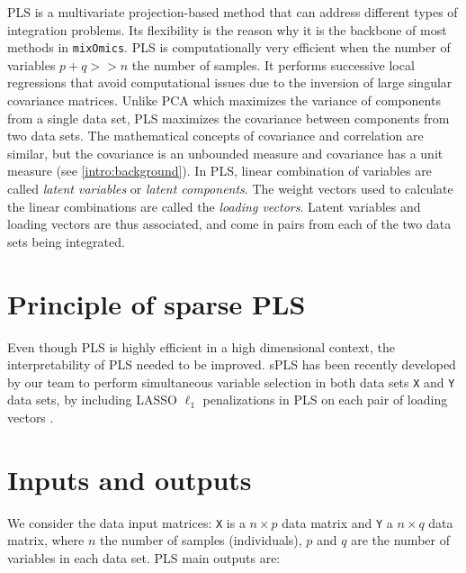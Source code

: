 \documentclass[]{book}
\begin{document}
PLS is a multivariate projection-based method that can address different types of integration problems. Its flexibility is the reason why it is the backbone of most methods in \texttt{mixOmics}. PLS is computationally very efficient when the number of variables \(p + q >> n\) the number of samples. It performs successive local regressions that avoid computational issues due to the inversion of large singular covariance matrices. Unlike PCA which maximizes the variance of components from a single data set, PLS maximizes the covariance between components from two data sets. The mathematical concepts of covariance and correlation are similar, but the covariance is an unbounded measure and covariance has a unit measure (see \ref{intro:background}). In PLS, linear combination of variables are called \emph{latent variables} or \emph{latent components}. The weight vectors used to calculate the linear combinations are called the \emph{loading vectors}. Latent variables and loading vectors are thus associated, and come in pairs from each of the two data sets being integrated.

\hypertarget{principle-of-sparse-pls}{%
\section{Principle of sparse PLS}\label{principle-of-sparse-pls}}

Even though PLS is highly efficient in a high dimensional context, the interpretability of PLS needed to be improved. sPLS has been recently developed by our team to perform simultaneous variable selection in both data sets \texttt{X} and \texttt{Y} data sets, by including LASSO \(\ell_1\) penalizations in PLS on each pair of loading vectors \citep{Lec08}.

\hypertarget{inputs-and-outputs-1}{%
\section{Inputs and outputs}\label{inputs-and-outputs-1}}

We consider the data input matrices: \texttt{X} is a \(n \times p\) data matrix and \texttt{Y} a \(n \times q\) data matrix, where \(n\) the number of samples (individuals), \(p\) and \(q\) are the number of variables in each data set. PLS main outputs are:
\end{document}
